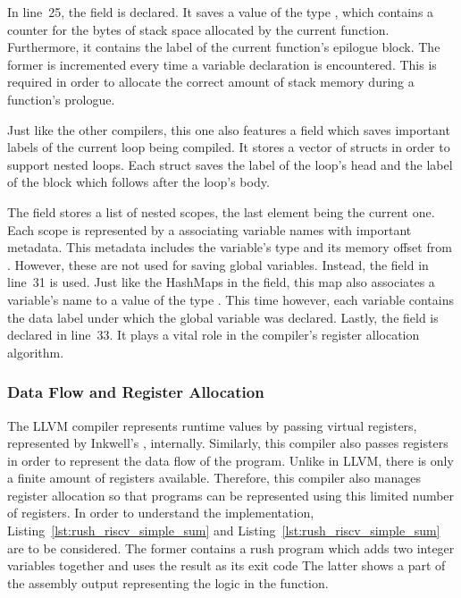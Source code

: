 In line~25, the  field is declared.
It saves a value of the type , which contains a counter for the bytes of stack space allocated by the current function.
Furthermore, it contains the label of the current function's epilogue block.
The former is incremented every time a variable declaration is encountered.
This is required in order to allocate the correct amount of stack memory during a function's prologue.

Just like the other compilers, this one also features a  field which saves important labels of the current loop being compiled.
It stores a vector of  structs in order to support nested loops.
Each  struct saves the label of the loop's head and the label of the block which follows after the loop's body.

The  field stores a list of nested scopes, the last element being the current one.
Each scope is represented by a  associating variable names with important metadata.
This metadata includes the variable's type and its memory offset from .
However, these  are not used for saving global variables.
Instead, the  field in line~31 is used.
Just like the HashMaps in the  field, this map also associates a variable's name to a value of the type .
This time however, each variable contains the data label under which the global variable was declared.
Lastly, the  field is declared in line~33.
It plays a vital role in the compiler's register allocation algorithm.

\subsubsection{Data Flow and Register Allocation}

The LLVM compiler represents runtime values by passing virtual registers, represented by Inkwell's , internally.
Similarly, this compiler also passes registers in order to represent the data flow of the program.
Unlike in LLVM, there is only a finite amount of registers available.
Therefore, this compiler also manages register allocation so that programs can be represented using this limited number of registers.
In order to understand the implementation, Listing~\ref{lst:rush_riscv_simple_sum} and Listing~\ref{lst:rush_riscv_simple_sum} are to be considered.
The former contains a rush program which adds two integer variables together and uses the result as its exit code
The latter shows a part of the assembly output representing the logic in the  function.

